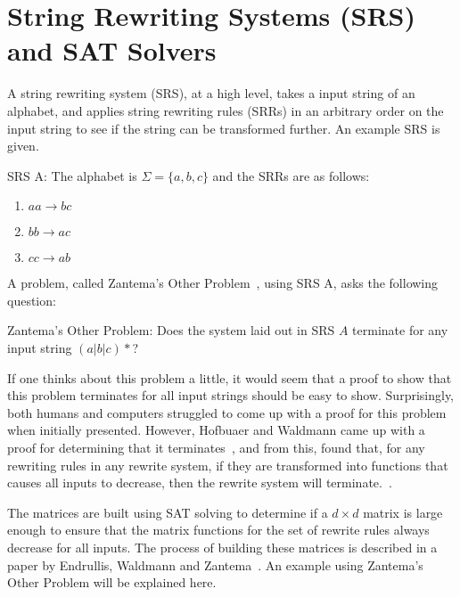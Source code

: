 
\chapter{String Rewriting Systems (SRS) and SAT Solvers} \label{sec:SRSandSAT}
A string rewriting system (SRS), at a high level, takes a input string of an alphabet, and applies string rewriting rules (SRRs) in an arbitrary order on the input string to see if the string can be transformed further. An example SRS is given.
\begin{definition}{SRS A:} 
The alphabet is $\Sigma = \{a, b, c\}$ and the SRRs are as follows:
\begin{enumerate}
    \item $aa \rightarrow bc$
    \item $bb \rightarrow ac$
    \item $cc \rightarrow ab$
\end{enumerate}
\end{definition}
A problem, called Zantema's Other Problem~\cite{Hofbauer:2006:TA:1142725.1711178}, using SRS A, asks the following question:\par\noindent
\begin{question}{Zantema's Other Problem:}
Does the system laid out in SRS $A$ terminate for any input string $(a|b|c)*$?
\end{question}
If one thinks about this problem a little, it would seem that a proof to show that this problem terminates for all input strings should be easy to show.  Surprisingly, both humans and computers struggled to come up with a proof for this problem when initially presented.  However, Hofbuaer and Waldmann came up with a proof for determining that it terminates~\cite{Hofbauer:2006:TA:1142725.1711178}, and from this, found that, for any rewriting rules in any rewrite system, if they are transformed into functions that causes all inputs to decrease, then the rewrite system will terminate.~\cite{Hofbauer2006}. \par
The matrices are built using SAT solving to determine if a $d \times d$ matrix is large enough to ensure that the matrix functions for the set of rewrite rules always decrease for all inputs. The process of building these matrices is described in a paper by Endrullis, Waldmann and Zantema~\cite{Endrullis2006}. An example using Zantema's Other Problem will be explained here.\par
